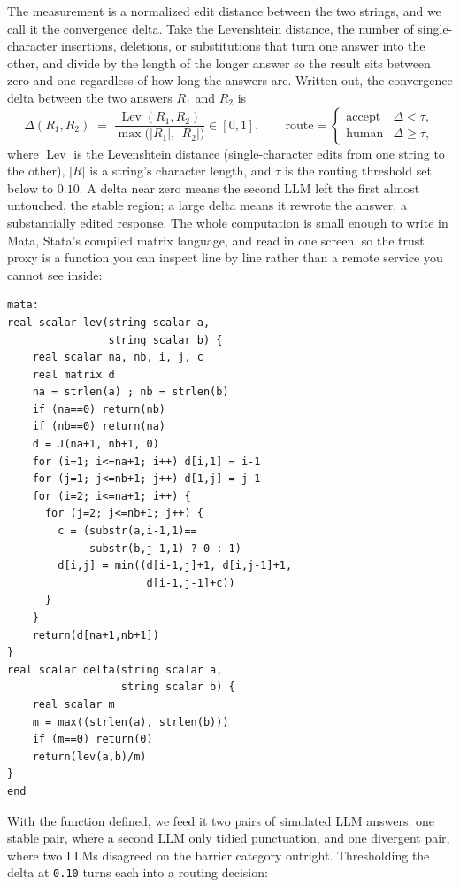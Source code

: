 The measurement is a normalized edit distance between the two strings, and we call it the convergence delta. Take the Levenshtein distance, the number of single-character insertions, deletions, or substitutions that turn one answer into the other, and divide by the length of the longer answer so the result sits between zero and one regardless of how long the answers are. Written out, the convergence delta between the two answers $R_1$ and $R_2$ is
\[
\Delta(R_1,R_2)
\;=\;
\frac{\operatorname{Lev}(R_1,R_2)}{\max\!\bigl(|R_1|,\,|R_2|\bigr)}
\in [0,1],
\qquad
\text{route} =
\begin{cases}
\text{accept} & \Delta < \tau,\\[2pt]
\text{human}  & \Delta \ge \tau,
\end{cases}
\]
where $\operatorname{Lev}$ is the Levenshtein distance (single-character edits from one string to the other), $|R|$ is a string's character length, and $\tau$ is the routing threshold set below to $0.10$. A delta near zero means the second LLM left the first almost untouched, the stable region; a large delta means it rewrote the answer, a substantially edited response. The whole computation is small enough to write in Mata, Stata's compiled matrix language, and read in one screen, so the trust proxy is a function you can inspect line by line rather than a remote service you cannot see inside:
\par
{\footnotesize
\begin{verbatim}
mata:
real scalar lev(string scalar a,
                string scalar b) {
    real scalar na, nb, i, j, c
    real matrix d
    na = strlen(a) ; nb = strlen(b)
    if (na==0) return(nb)
    if (nb==0) return(na)
    d = J(na+1, nb+1, 0)
    for (i=1; i<=na+1; i++) d[i,1] = i-1
    for (j=1; j<=nb+1; j++) d[1,j] = j-1
    for (i=2; i<=na+1; i++) {
      for (j=2; j<=nb+1; j++) {
        c = (substr(a,i-1,1)==
             substr(b,j-1,1) ? 0 : 1)
        d[i,j] = min((d[i-1,j]+1, d[i,j-1]+1,
                      d[i-1,j-1]+c))
      }
    }
    return(d[na+1,nb+1])
}
real scalar delta(string scalar a,
                  string scalar b) {
    real scalar m
    m = max((strlen(a), strlen(b)))
    if (m==0) return(0)
    return(lev(a,b)/m)
}
end
\end{verbatim}
}
With the function defined, we feed it two pairs of simulated LLM answers: one stable pair, where a second LLM only tidied punctuation, and one divergent pair, where two LLMs disagreed on the barrier category outright. Thresholding the delta at \texttt{0.10} turns each into a routing decision:
